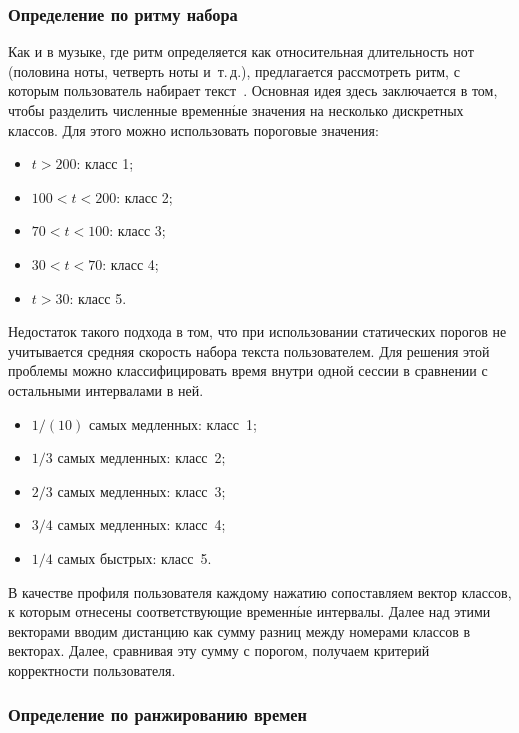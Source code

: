 \begin{multicols}{2}
\vspace*{-4pt}

\subsubsection{Определение по ритму набора}

Как и в музыке, где ритм определяется как относительная длительность
нот (половина ноты, чет\-верть ноты и~т.\,д.), предлагается рассмотреть
ритм, с которым пользователь набирает текст~\cite{hocquet}. Основная
идея здесь заключается в том, чтобы разделить численные временн$\acute{\mbox{ы}}$е
значения на несколько дискретных классов. Для этого можно
использовать пороговые значения:
\begin{itemize}
    \item $t > 200$: класс 1;\\[-14pt]
    \item $100 <t < 200$: класс 2;\\[-14pt]
    \item $70<t < 100$: класс 3;\\[-14pt]
    \item $30< t < 70$: класс 4;\\[-14pt]
    \item $t>30$: класс 5.
\end{itemize}
Недостаток такого подхода в том, что при использовании статических
порогов не учитывается средняя скорость набора текста пользователем.
Для решения этой проблемы можно классифицировать время внутри одной
сессии в сравнении с остальными интервалами в ней.
\begin{itemize}
    \item ${1}/(10)$ самых медленных: класс~1;
    \item ${1}/{3}$ самых медленных: класс~2;
    \item ${2/}{3}$ самых медленных: класс~3;
    \item ${3}/{4}$ самых медленных: класс~4;
    \item ${1}/{4}$ самых быстрых: класс~5.
\end{itemize}
В качестве профиля пользователя каждому нажатию сопоставляем вектор
классов, к которым отнесены соответствующие временн$\acute{\mbox{ы}}$е интервалы.
Далее над этими векторами вводим дистанцию как сумму разниц между
номерами классов в векторах. Далее, сравнивая эту сумму с порогом,
получаем критерий корректности пользователя.

\subsubsection{Определение по ранжированию времен}


\end{multicols}
